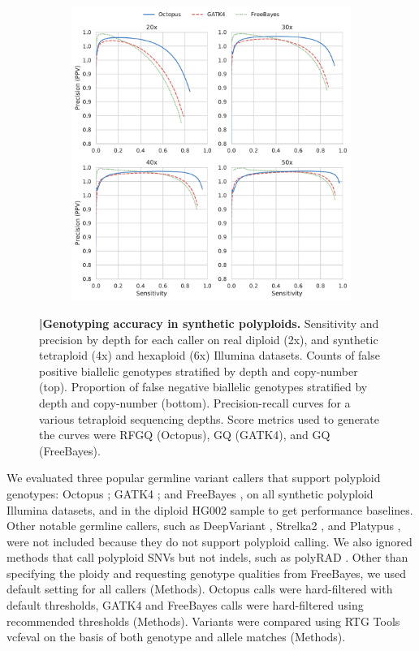 \documentclass[notitlepage, twocolumn, 10pt]{article}
\begin{document}
\begin{figure}[ht!]
\begin{subfigure}[b]{0.4\textwidth}
        \includegraphics[height=\textwidth,width=\textwidth]{figures/synthetic-tetraploid-pr-curves_20-50x}
        \label{fig:synthetic:precision-recall}
    \end{subfigure}
    \vspace{-1cm}
    \caption{\textbf{|\:Genotyping accuracy in synthetic polyploids.} \protect{} Sensitivity and precision by depth for each caller on real diploid (2x), and synthetic tetraploid (4x) and hexaploid (6x) Illumina datasets. \protect{} Counts of false positive biallelic genotypes stratified by depth and copy-number (top). Proportion of false negative biallelic genotypes stratified by depth and copy-number (bottom). \protect{} Precision-recall curves for a various tetraploid sequencing depths. Score metrics used to generate the curves were RFGQ (Octopus), GQ (GATK4), and GQ (FreeBayes).}
    \label{fig:synthetic}
\end{figure}

We evaluated three popular germline variant callers that support polyploid genotypes: Octopus \cite{RN663}; GATK4 \cite{RN598}; and FreeBayes \cite{RN538}, on all synthetic polyploid Illumina datasets, and in the diploid HG002 sample to get performance baselines. Other notable germline callers, such as DeepVariant \cite{RN619}, Strelka2 \cite{RN604}, and Platypus \cite{RN5}, were not included because they do not support polyploid calling. We also ignored methods that  call polyploid SNVs but not indels, such as polyRAD \cite{RN662}. Other than specifying the ploidy and requesting genotype qualities from FreeBayes, we used default setting for all callers (Methods). Octopus calls were hard-filtered with default thresholds, GATK4 and FreeBayes calls were hard-filtered using recommended thresholds (Methods). Variants were compared using RTG Tools vcfeval \cite{RN169} on the basis of both genotype and allele matches (Methods).
\end{document}
